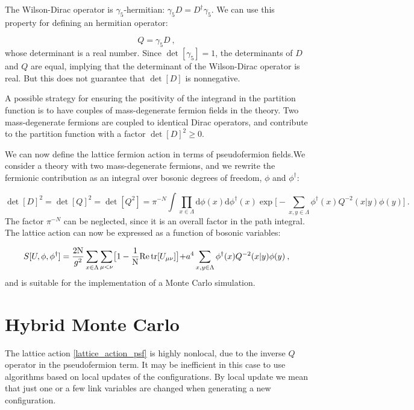 The Wilson-Dirac operator is $\gamma_5$-hermitian: $\gamma_5 D = D^{\dagger} \gamma_5$. We  can use this property for defining an hermitian operator:

\begin{equation}
Q = \gamma_5 D \: ,
\end{equation}
% 
 whose determinant is a real number. Since $\det[ \gamma_5] = 1$,  the determinants of $D$ and $Q$ are equal, implying that the determinant of the Wilson-Dirac operator is real. But this does not guarantee that $\det[D]$ is nonnegative.

A possible strategy for ensuring the positivity of the integrand in the partition function is to have couples of mass-degenerate fermion fields in the theory. Two mass-degenerate fermions are coupled to identical Dirac operators, and contribute to the partition function with a factor $\det[D]^2 \geq 0$. 

We can now define the lattice fermion action in terms of pseudofermion fields.We consider a theory with two mass-degenerate fermions, and we rewrite the fermionic contribution as an integral over bosonic degrees of freedom, $\phi$ and $\phi^{\dagger}$:

\begin{equation}
\det[D]^2 = \det[Q]^2 = \det[Q^2] = \pi^{-N} \int \prod_{x \in \Lambda} \mathrm{d} \phi(x) \mathrm{d} \phi^{\dagger}(x) \exp \biggl[ 
-\sum_{x,y \in \Lambda} \phi^{\dagger}(x) Q^{-2} (x \vert y) \phi(y) \biggr] \: .
\end{equation}
%
The factor $\pi^{-N}$ can be neglected, since it is an overall factor in the path integral. The lattice action can now be expressed as a function of bosonic variables:

\begin{equation}
S[U,\phi,\phi^{\dagger}] = \frac{2 \mathrm N}{g^2} \sum_{x \in \Lambda}  \sum_{\mu < \nu} \bigr[  1 - \frac{1}{\mathrm{N}} \mathrm{Re} \tr  [U_{\mu \nu}] \bigl ] +  a^4 \sum_{x,y \in \Lambda} \phi^{\dagger}(x) Q^{-2}(x \vert y)\phi(y) \: ,
\label{lattice_action_psf}
\end{equation}
%
and is suitable for the implementation of a Monte Carlo simulation.


\section{Hybrid Monte Carlo}

The lattice action \ref{lattice_action_psf} is highly nonlocal, due to the inverse $Q$ operator in the pseudofermion term. It may be inefficient in this case to use algorithms based on local updates  of the configurations. By local update we mean that just one or a few link variables are changed when generating a new configuration. 

